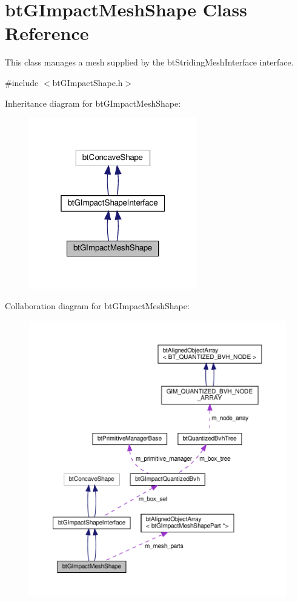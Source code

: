 \hypertarget{classbtGImpactMeshShape}{}\section{bt\+G\+Impact\+Mesh\+Shape Class Reference}
\label{classbtGImpactMeshShape}


This class manages a mesh supplied by the bt\+Striding\+Mesh\+Interface interface.  




{\ttfamily \#include $<$bt\+G\+Impact\+Shape.\+h$>$}



Inheritance diagram for bt\+G\+Impact\+Mesh\+Shape\+:
\nopagebreak
\begin{figure}[H]
\begin{center}
\leavevmode
\includegraphics[width=208pt]{classbtGImpactMeshShape__inherit__graph}
\end{center}
\end{figure}


Collaboration diagram for bt\+G\+Impact\+Mesh\+Shape\+:
\nopagebreak
\begin{figure}[H]
\begin{center}
\leavevmode
\includegraphics[width=350pt]{classbtGImpactMeshShape__coll__graph}
\end{center}
\end{figure}
